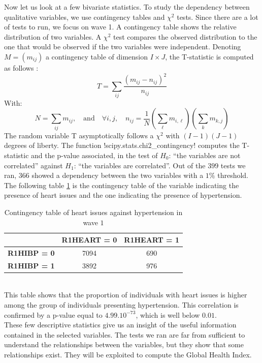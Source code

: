 \documentclass[]{article}
\begin{document}
\noindent
Now let us look at a few bivariate statistics. To study the dependency between qualitative variables, we use contingency tables and $\chi^2$ tests. Since there are a lot of tests to run, we focus on wave 1. A contingency table shows the relative distribution of two variables. A $\chi^2$ test compares the observed distribution to the one that would be observed if the two variables were independent. Denoting $M=(m_{ij})$ a contingency table of dimension $I\times J$, the T-statistic is computed as follows \cite{chi2test}: 
\begin{equation}
	T = \sum_{ij}\frac{(m_{ij}-n_{ij})^2}{n_{ij}}
\end{equation}
With:
\begin{equation}
	N=\sum_{ij}m_{ij}, \quad \text{and}\quad \forall i,j,\quad n_{ij} = \frac{1}{N} \left(\sum_{\ell}m_{i,\ell}\right) \left(\sum_{k}m_{k,j}\right) 
\end{equation}
The random variable T asymptotically follows a $\chi^2$ with $(I-1)(J-1)$ degrees of liberty. The function \pyth!scipy.stats.chi2_contingency! computes the T-statistic and the p-value associated, in the test of $H_0$: “the variables are not correlated” against $H_1$: “the variables are correlated”.
Out of the $399$ tests we ran, $366$ showed a dependency between the two variables with a $1\%$ threshold. The following table \ref{contingency_table} is the contingency table of the variable indicating the presence of heart issues and the one indicating the presence of hypertension.
\begin{table}[!h]
	\centering
	\begin{tabular}{|c|c|c|}
		\hline
		& \textbf{R1HEART = 0} & \textbf{R1HEART = 1} \\
		\hline
		\textbf{R1HIBP = 0} & 7094 & 690 \\
		\hline
		\textbf{R1HIBP = 1} & 3892 & 976 \\
		\hline
	\end{tabular}
	\caption{Contingency table of heart issues against hypertension in wave $1$}
	\label{contingency_table}
\end{table}\\
This table shows that the proportion of individuals with heart issues is higher among the group of individuals presenting hypertension. This correlation is confirmed by a p-value equal to $4.99.10^{-73}$, which is well below $0.01$.\\

\noindent
These few descriptive statistics give us an insight of the useful information contained in the selected variables. The tests we ran are far from sufficient to understand the relationships between the variables, but they show that some relationships exist. They will be exploited to compute the Global Health Index.
\end{document}
